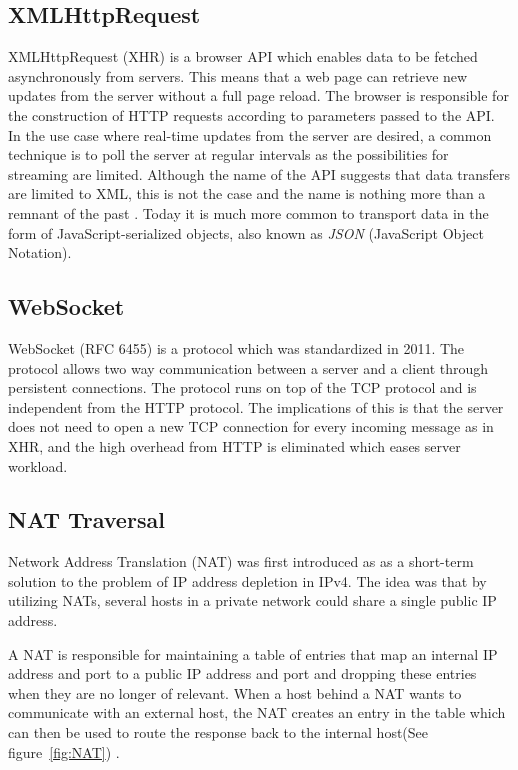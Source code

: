 \subsection{XMLHttpRequest}
XMLHttpRequest (XHR) is a browser API which enables data to be fetched asynchronously from servers. This means that a web page can retrieve new updates from the server without a full page reload. The browser is responsible for the construction of HTTP requests according to parameters passed to the API. In the use case where real-time updates from the server are desired, a common technique is to poll the server at regular intervals as the possibilities for streaming are limited. Although the name of the API suggests that data transfers are limited to XML, this is not the case and the name is nothing more than a remnant of the past \cite{XHR:Online}. Today it is much more common to transport data in the form of JavaScript-serialized objects, also known as \emph{JSON} (JavaScript Object Notation).

\subsection{WebSocket}
WebSocket (RFC 6455)\cite{RFC6455:Online} is a protocol which was standardized in 2011. The protocol allows two way communication between a server and a client through persistent connections. The protocol runs on top of the TCP protocol and is independent from the HTTP protocol. The implications of this is that the server does not need to open a new TCP connection for every incoming message as in XHR, and the high overhead from HTTP is eliminated which eases server workload.

\subsection{NAT Traversal}
Network Address Translation (NAT)\cite{RFC1631:Online} was first introduced as as a short-term solution to the problem of IP address depletion in IPv4. The idea was that by utilizing NATs, several hosts in a private network could share a single public IP address.

A NAT is responsible for maintaining a table of entries that map an internal IP address and port to a public IP address and port and dropping these entries when they are no longer of relevant. When a host behind a NAT wants to communicate with an external host, the NAT creates an entry in the table which can then be used to route the response back to the internal host(See figure~\ref{fig:NAT}) \cite{RFC5245:Online}.

